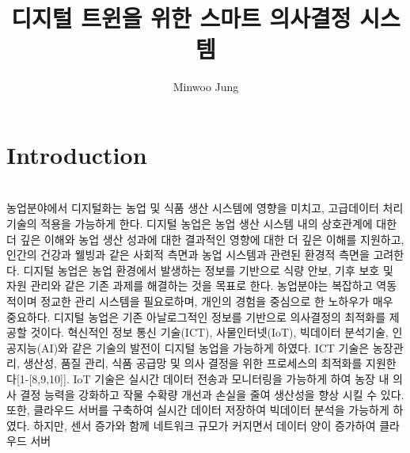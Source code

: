 \documentclass[11pt]{article}
\title{디지털 트윈을 위한 스마트 의사결정 시스템}
\author{Minwoo Jung}
\begin{document}
\maketitle

\section{Introduction}

\indent \\농업분야에서 디지털화는 농업 및 식품 생산 시스템에 영향을 미치고, 고급데이터 처리 기술의 적용을 가능하게 한다. 디지털 농업은 농업 생산 시스템 내의 상호관계에 대한 더 깊은 이해와 농업 생산 성과에 대한 결과적인 영향에 대한 더 깊은 이해를 지원하고, 인간의 건강과 웰빙과 같은 사회적 측면과 농업 시스템과 관련된 환경적 측면을 고려한다. 디지털 농업은 농업 환경에서 발생하는 정보를 기반으로 식량 안보, 기후 보호 및 자원 관리와 같은 기존 과제를 해결하는 것을 목표로 한다. 농업분야는 복잡하고 역동적이며 정교한 관리 시스템을 필요로하며, 개인의 경험을 중심으로 한 노하우가 매우 중요하다. 디지털 농업은 기존 아날로그적인 정보를 기반으로 의사결정의 최적화를 제공할 것이다. 혁신적인 정보 통신 기술(ICT), 사물인터넷(IoT), 빅데이터 분석기술, 인공지능(AI)와 같은 기술의 발전이 디지털 농업을 가능하게 하였다. ICT 기술은 농장관리, 생산성, 품질 관리, 식품 공급망 및 의사 결정을 위한 프로세스의 최적화를 지원한다[1-[8,9,10]]. IoT 기술은 실시간 데이터 전송과 모니터링을 가능하게 하여 농장 내 의사 결정 능력을 강화하고 작물 수확량 개선과 손실을 줄여 생산성을 향상 시킬 수 있다. 또한, 클라우드 서버를 구축하여 실시간 데이터 저장하여 빅데이터 분석을 가능하게 하였다. 하지만, 센서 증가와 함께 네트워크 규모가 커지면서 데이터 양이 증가하여 클라우드 서버
\end{document}
